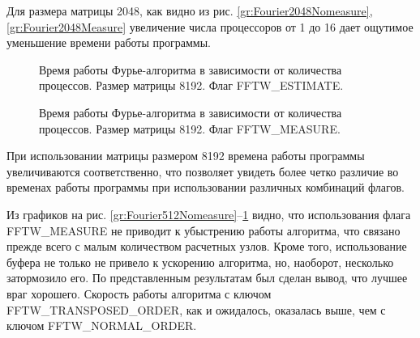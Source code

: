 Для размера матрицы 2048, как видно из рис. \ref{gr:Fourier2048Nomeasure}, \ref{gr:Fourier2048Measure} увеличение числа процессоров от 1 до 16 дает ощутимое уменьшение времени работы программы.
		
	\begin{figure}[h!]
		\begin{center}
			\begin{minipage}{0.45\linewidth}
                \caption{Время работы Фурье-алгоритма в зависимости от количества процессов. Размер матрицы 8192. Флаг FFTW\_ESTIMATE.}
                \label{gr:Fourier8192Nomeasure}
			\end{minipage}
			\hfill
			\begin{minipage}{0.45\linewidth}
                \caption{Время работы Фурье-алгоритма в зависимости от количества процессов. Размер матрицы 8192. Флаг FFTW\_MEASURE.}
                \label{gr:Fourier8192Measure}
			\end{minipage}
		\end{center}
	\end{figure}

При использовании матрицы размером 8192 времена работы программы увеличиваются соответственно, что позволяет увидеть более четко различие во временах работы программы при использовании различных комбинаций флагов.

Из графиков на рис. \ref{gr:Fourier512Nomeasure}--\ref{gr:Fourier8192Measure} видно, что использования флага FFTW\_MEASURE не приводит к убыстрению работы алгоритма, что связано прежде всего с малым количеством расчетных узлов.
Кроме того, использование буфера не только не привело к ускорению алгоритма, но, наоборот, несколько затормозило его.
По представленным результатам был сделан вывод, что лучшее враг хорошего. Скорость работы алгоритма с ключом FFTW\_TRANSPOSED\_ORDER, как и ожидалось, оказалась выше, чем с ключом FFTW\_NORMAL\_ORDER.

